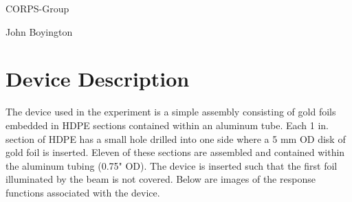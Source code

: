 \documentclass{amsart}
\theoremstyle{definition}
\begin{document}
\LARGE{CORPS-Group}
 
\large
John Boyington
\newline
\bigskip


\section{Device Description}
\bigskip

The device used in the experiment is a simple assembly consisting of gold foils embedded in HDPE sections contained within an aluminum tube.
Each 1 in. section of HDPE has a small hole drilled into one side where a 5 mm OD disk of gold foil is inserted.
Eleven of these sections are assembled and contained within the aluminum tubing (0.75" OD).
The device is inserted such that the first foil illuminated by the beam is not covered.
Below are images of the response functions associated with the device.
\end{document}
